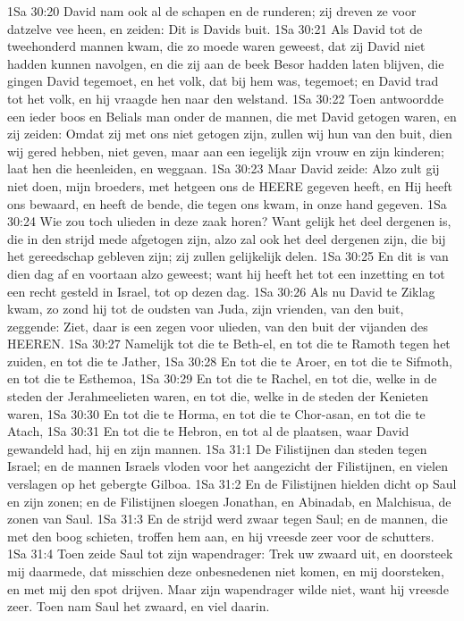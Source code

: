 1Sa 30:20  David nam ook al de schapen en de runderen; zij dreven ze voor datzelve vee heen, en zeiden: Dit is Davids buit.
1Sa 30:21  Als David tot de tweehonderd mannen kwam, die zo moede waren geweest, dat zij David niet hadden kunnen navolgen, en die zij aan de beek Besor hadden laten blijven, die gingen David tegemoet, en het volk, dat bij hem was, tegemoet; en David trad tot het volk, en hij vraagde hen naar den welstand.
1Sa 30:22  Toen antwoordde een ieder boos en Belials man onder de mannen, die met David getogen waren, en zij zeiden: Omdat zij met ons niet getogen zijn, zullen wij hun van den buit, dien wij gered hebben, niet geven, maar aan een iegelijk zijn vrouw en zijn kinderen; laat hen die heenleiden, en weggaan.
1Sa 30:23  Maar David zeide: Alzo zult gij niet doen, mijn broeders, met hetgeen ons de HEERE gegeven heeft, en Hij heeft ons bewaard, en heeft de bende, die tegen ons kwam, in onze hand gegeven.
1Sa 30:24  Wie zou toch ulieden in deze zaak horen? Want gelijk het deel dergenen is, die in den strijd mede afgetogen zijn, alzo zal ook het deel dergenen zijn, die bij het gereedschap gebleven zijn; zij zullen gelijkelijk delen.
1Sa 30:25  En dit is van dien dag af en voortaan alzo geweest; want hij heeft het tot een inzetting en tot een recht gesteld in Israel, tot op dezen dag.
1Sa 30:26  Als nu David te Ziklag kwam, zo zond hij tot de oudsten van Juda, zijn vrienden, van den buit, zeggende: Ziet, daar is een zegen voor ulieden, van den buit der vijanden des HEEREN.
1Sa 30:27  Namelijk tot die te Beth-el, en tot die te Ramoth tegen het zuiden, en tot die te Jather,
1Sa 30:28  En tot die te Aroer, en tot die te Sifmoth, en tot die te Esthemoa,
1Sa 30:29  En tot die te Rachel, en tot die, welke in de steden der Jerahmeelieten waren, en tot die, welke in de steden der Kenieten waren,
1Sa 30:30  En tot die te Horma, en tot die te Chor-asan, en tot die te Atach,
1Sa 30:31  En tot die te Hebron, en tot al de plaatsen, waar David gewandeld had, hij en zijn mannen.
1Sa 31:1  De Filistijnen dan steden tegen Israel; en de mannen Israels vloden voor het aangezicht der Filistijnen, en vielen verslagen op het gebergte Gilboa.
1Sa 31:2  En de Filistijnen hielden dicht op Saul en zijn zonen; en de Filistijnen sloegen Jonathan, en Abinadab, en Malchisua, de zonen van Saul.
1Sa 31:3  En de strijd werd zwaar tegen Saul; en de mannen, die met den boog schieten, troffen hem aan, en hij vreesde zeer voor de schutters.
1Sa 31:4  Toen zeide Saul tot zijn wapendrager: Trek uw zwaard uit, en doorsteek mij daarmede, dat misschien deze onbesnedenen niet komen, en mij doorsteken, en met mij den spot drijven. Maar zijn wapendrager wilde niet, want hij vreesde zeer. Toen nam Saul het zwaard, en viel daarin.
